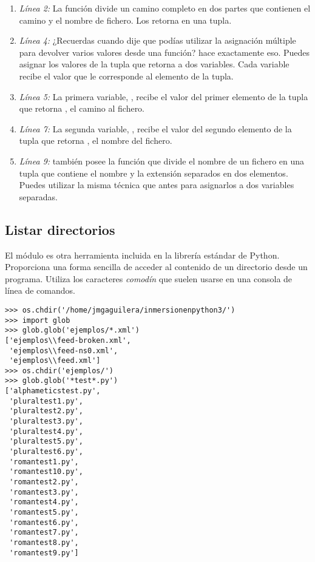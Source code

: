 \begin{enumerate}

\item \emph{Línea 2:} La función  divide un camino completo en dos partes que contienen el camino y el nombre de fichero. Los retorna en una tupla.

\item \emph{Línea 4:} ¿Recuerdas cuando dije que podías utilizar la asignación múltiple para devolver varios valores desde una función?  hace exactamente eso. Puedes asignar los valores de la tupla que retorna a dos variables. Cada variable recibe el valor que le corresponde al elemento de la tupla.

\item \emph{Línea 5:} La primera variable, , recibe el valor del primer elemento de la tupla que retorna , el camino al fichero.

\item \emph{Línea 7:} La segunda variable, , recibe el valor del segundo elemento de la tupla que retorna , el nombre del fichero.

\item \emph{Línea 9:}  también posee la función  que divide el nombre de un fichero en una tupla que contiene el nombre y la extensión separados en dos elementos. Puedes utilizar la misma técnica que antes para asignarlos a dos variables separadas.

\end{enumerate}

\subsection{Listar directorios}

El módulo  es otra herramienta incluida en la librería estándar de Python. Proporciona una forma sencilla de acceder al contenido de un directorio desde un programa. Utiliza los caracteres \emph{comodín} que suelen usarse en una consola de línea de comandos.

\noindent\begin{minipage}{\textwidth}
\begin{lstlisting}[mathescape=True]
>>> os.chdir('/home/jmgaguilera/inmersionenpython3/')
>>> import glob
>>> glob.glob('ejemplos/*.xml')
['ejemplos\\feed-broken.xml',
 'ejemplos\\feed-ns0.xml',
 'ejemplos\\feed.xml']
>>> os.chdir('ejemplos/')
>>> glob.glob('*test*.py')
['alphameticstest.py',
 'pluraltest1.py',
 'pluraltest2.py',
 'pluraltest3.py',
 'pluraltest4.py',
 'pluraltest5.py',
 'pluraltest6.py',
 'romantest1.py',
 'romantest10.py',
 'romantest2.py',
 'romantest3.py',
 'romantest4.py',
 'romantest5.py',
 'romantest6.py',
 'romantest7.py',
 'romantest8.py',
 'romantest9.py']
\end{lstlisting}
\end{minipage}

